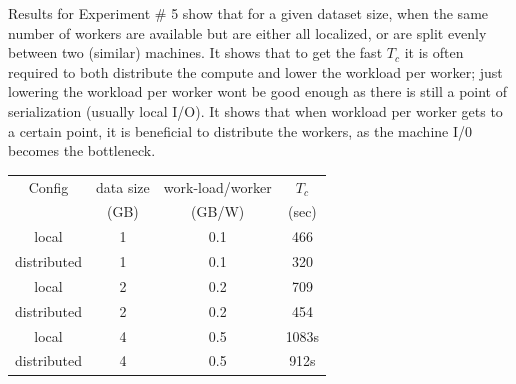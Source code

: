 \documentclass[conference,final]{IEEEtran}
\newcommand{\tc }{ $T_c$ }
\begin{document}


Results for Experiment \# 5 show that for a given dataset size,
when the same number of workers are available but are
either all localized, or are split evenly between two (similar)
machines. It shows that to get the fast \tc it is often required to
both distribute the compute and lower the workload per worker; just
lowering the workload per worker wont be good enough as there is still
a point of serialization (usually local I/O).  It shows that when
workload per worker gets to a certain point, it is beneficial
to distribute the workers, as the machine I/0 becomes the bottleneck.


\begin{tabular}{cccc}
  \hline
  Config  &  data size   &   work-load/worker & $T_c$  \\
  &   (GB)  & (GB/W) & (sec) \\
  \hline
  local & 1 & 0.1 & 466 \\
  \hline
  distributed & 1 & 0.1 & 320 \\
  \hline \hline
  local & 2 & 0.2 & 709 \\
  \hline 
  distributed & 2 & 0.2 & 454 \\
  \hline \hline
local &  4 & 0.5 & 1083s\\
\hline
distributed &  4 &  0.5&  912s \\
\hline \hline
\end{tabular}

\end{document}
